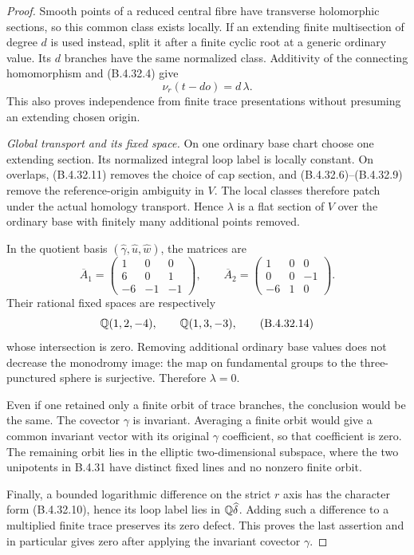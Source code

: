 \begin{proof}
Smooth points of a reduced central fibre have transverse
holomorphic sections, so this common class exists locally.
If an extending finite multisection of degree $d$ is used
instead, split it after a finite cyclic root at a generic
ordinary value. Its $d$ branches have the same normalized
class. Additivity of the connecting homomorphism and
(B.4.32.4) give
\[
            \nu_r(t-do)=d\,\lambda .
 \tag{B.4.32.12}
\]
This also proves independence from finite trace
presentations without presuming an extending chosen origin.

\emph{Global transport and its fixed space.}
On one ordinary base chart choose one extending section.
Its normalized integral loop label is locally constant.
On overlaps, (B.4.32.11) removes the choice of cap section,
and (B.4.32.6)--(B.4.32.9) remove the reference-origin
ambiguity in $V$. The local classes therefore patch under
the actual homology transport. Hence $\lambda$ is a flat
section of $V$ over the ordinary base with finitely many
additional points removed.

In the quotient basis
$(\widehat\gamma,\widehat u,\widehat w)$, the matrices are
\[
 \overline A_1=
 \begin{pmatrix}1&0&0\\6&0&1\\-6&-1&-1\end{pmatrix},
 \qquad
 \overline A_2=
 \begin{pmatrix}1&0&0\\0&0&-1\\-6&1&0\end{pmatrix}.
 \tag{B.4.32.13}
\]
Their rational fixed spaces are respectively
\[
 \mathbb Q(1,2,-4),\qquad \mathbb Q(1,3,-3),
 \tag{B.4.32.14}
\]
whose intersection is zero. Removing additional ordinary
base values does not decrease the monodromy image: the
map on fundamental groups to the three-punctured sphere
is surjective. Therefore $\lambda=0$.

Even if one retained only a finite orbit of trace branches,
the conclusion would be the same. The covector $\gamma$
is invariant. Averaging a finite orbit would give a common
invariant vector with its original $\gamma$ coefficient,
so that coefficient is zero. The remaining orbit lies in
the elliptic two-dimensional subspace, where the two
unipotents in B.4.31 have distinct fixed lines and no
nonzero finite orbit.

Finally, a bounded logarithmic difference on the strict
$r$ axis has the character form (B.4.32.10), hence its
loop label lies in $\mathbb Q\widehat\delta$. Adding such a
difference to a multiplied finite trace preserves its
zero defect. This proves the last assertion and in
particular gives zero after applying the invariant
covector $\gamma$.
\end{proof}

